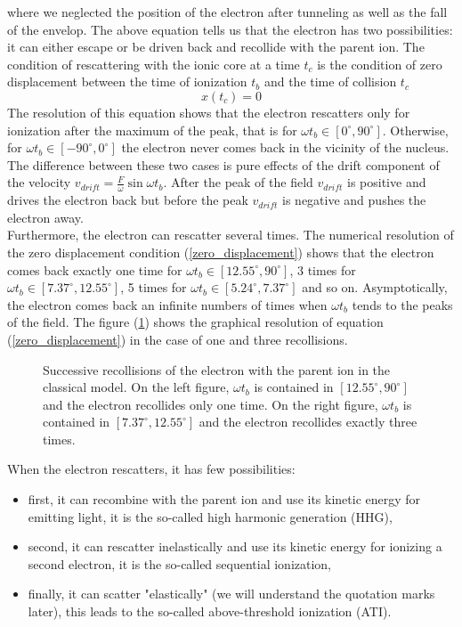 \documentclass[a4paper]{article}
\begin{document}
where we neglected the position of the electron after tunneling as well as the fall of the envelop.
The above equation tells us that the electron has two possibilities: it can either escape or be driven back and recollide with the parent ion. The condition of rescattering with the ionic core at a time $t_{c}$ is the condition of zero displacement between the time of ionization $t_{b}$ and the time of collision $t_{c}$
\begin{equation}
\label{zero_displacement}
x(t_{c})=0 
\end{equation}
The resolution of this equation shows that the electron rescatters only for ionization after the maximum of the peak, that is for $\omega t_{b} \in [0^{\circ},90^{\circ}]$. Otherwise, for $\omega t_{b} \in [-90^{\circ},0^{\circ}]$ the electron never comes back in the vicinity of the nucleus. The difference between these two cases is pure effects of the drift component of the velocity $v_{drift}=\frac{F}{\omega}\sin{\omega t_{b}}$. After the peak  of the field $v_{drift}$ is positive and drives the electron back but before the peak $v_{drift}$ is negative and pushes the electron away. \\
Furthermore, the electron can rescatter several times. The numerical resolution of the zero displacement condition (\ref{zero_displacement}) shows that the electron comes back exactly one time for $\omega t_{b} \in [12.55^{\circ},90^{\circ}]$, 3 times for $\omega t_{b} \in [7.37^{\circ},12.55^{\circ}]$, 5 times for $\omega t_{b} \in [5.24^{\circ},7.37^{\circ}]$ and so on. Asymptotically, the electron comes back an infinite numbers of times when $\omega t_{b}$ tends to the peaks of the field. The figure (\ref{successive_recollision}) shows the graphical resolution of equation (\ref{zero_displacement}) in the case of one and three recollisions.
\begin{figure}
\centering
 
 \caption{Successive recollisions of the electron with the parent ion in the classical model. On the left figure, $\omega t_{b}$ is contained in $[12.55^{\circ},90^{\circ}]$ and the electron recollides only one time. On the right figure, $\omega t_{b}$ is contained in $[7.37^{\circ},12.55^{\circ}]$ and the electron recollides exactly three times.}
 \label{successive_recollision} 
\end{figure}
\par 
When the electron rescatters, it has few possibilities:
\begin{itemize}
\item
first, it can recombine with the parent ion and use its kinetic energy for emitting light, it is the so-called high harmonic generation (HHG),
\item
second, it can rescatter inelastically and use its kinetic energy for ionizing a second electron, it is the so-called sequential ionization,
\item
finally, it can scatter "elastically" (we will understand the quotation marks later), this leads to the so-called above-threshold ionization (ATI).
\end{itemize}
\end{document}
